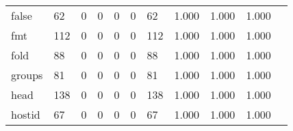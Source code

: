 \begin{longtable}{lp{1.2cm}p{1.2cm}p{1.2cm}p{1.2cm}p{1.2cm}p{1.2cm}p{1.2cm}p{1.2cm}p{1.2cm}p{1.2cm}}
false     &                                    62 &                                                  0 &                                                  0 &                                                  0 &                                                  0 &                                                 62 &                                              1.000 &                                              1.000 &                                              1.000 \\
fmt       &                                   112 &                                                  0 &                                                  0 &                                                  0 &                                                  0 &                                                112 &                                              1.000 &                                              1.000 &                                              1.000 \\
fold      &                                    88 &                                                  0 &                                                  0 &                                                  0 &                                                  0 &                                                 88 &                                              1.000 &                                              1.000 &                                              1.000 \\
groups    &                                    81 &                                                  0 &                                                  0 &                                                  0 &                                                  0 &                                                 81 &                                              1.000 &                                              1.000 &                                              1.000 \\
head      &                                   138 &                                                  0 &                                                  0 &                                                  0 &                                                  0 &                                                138 &                                              1.000 &                                              1.000 &                                              1.000 \\
hostid    &                                    67 &                                                  0 &                                                  0 &                                                  0 &                                                  0 &                                                 67 &                                              1.000 &                                              1.000 &                                              1.000 \\

\end{longtable}
